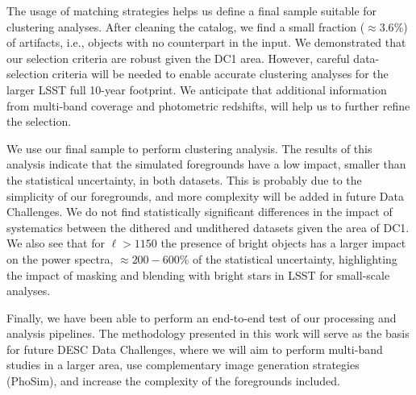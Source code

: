 \documentclass[\docopts]{\docclass}
\begin{document}
The usage of matching strategies helps us define a final sample suitable for clustering analyses. After cleaning the catalog, we find a small fraction ($\approx 3.6\%$) of artifacts, i.e., objects with no counterpart in the input. We demonstrated that our selection criteria are robust given the DC1 area. However, careful data-selection criteria will be needed to enable accurate clustering analyses for the larger LSST full 10-year footprint. We anticipate that additional information from multi-band coverage and photometric redshifts, will help us to further refine the selection.

We use our final sample to perform clustering analysis. The results of this analysis indicate that the simulated foregrounds have a low impact, smaller than the statistical uncertainty, in both datasets. This is probably due to the simplicity of our foregrounds, and more complexity will be added in future Data Challenges. We do not find statistically significant differences in the impact of systematics between the dithered and undithered datasets given the area of DC1. We also see that for $\ell > 1150$ the presence of bright objects has a larger impact on the power spectra, $\approx 200-600\%$ of the statistical uncertainty, highlighting the impact of masking and blending with bright stars in LSST for small-scale analyses.

Finally, we have been able to perform an end-to-end test of our processing and analysis pipelines. The methodology presented in this work will serve as the basis for future DESC Data Challenges, where we will aim to perform multi-band studies in a larger area, use complementary image generation strategies (PhoSim), and increase the complexity of the foregrounds included.

\appendix


\end{document}
